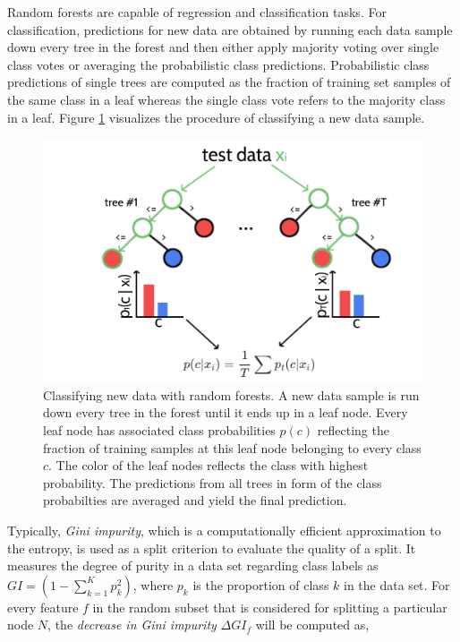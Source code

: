 \documentclass[11pt,a4paper,twoside]{book}
\theoremstyle{definition}
\theoremstyle{definition}
\theoremstyle{remark}
\begin{document}
Random forests are capable of regression and classification tasks. For
classification, predictions for new data are obtained by running each
data sample down every tree in the forest and then either apply majority
voting over single class votes or averaging the probabilistic class
predictions. Probabilistic class predictions of single trees are
computed as the fraction of training set samples of the same class in a
leaf whereas the single class vote refers to the majority class in a
leaf. Figure \ref{fig:rf-intro} visualizes the procedure of classifying
a new data sample.









\begin{figure}

{\centering \includegraphics[width=0.8\linewidth]{img/random_forest_contact_prior/intro_random_forest} 

}

\caption{Classifying new data with random forests. A new
data sample is run down every tree in the forest until it ends up in a
leaf node. Every leaf node has associated class probabilities \(p(c)\)
reflecting the fraction of training samples at this leaf node belonging
to every class \(c\). The color of the leaf nodes reflects the class
with highest probability. The predictions from all trees in form of the
class probabilties are averaged and yield the final prediction.}\label{fig:rf-intro}
\end{figure}

Typically, \emph{Gini impurity}, which is a computationally efficient
approximation to the entropy, is used as a split criterion to evaluate
the quality of a split. It measures the degree of purity in a data set
regarding class labels as \(GI = (1 - \sum_{k=1}^K p_k^2)\), where
\(p_k\) is the proportion of class \(k\) in the data set. For every
feature \(f\) in the random subset that is considered for splitting a
particular node \(N\), the \emph{decrease in Gini impurity}
\(\Delta GI_f\) will be computed as,
\end{document}
